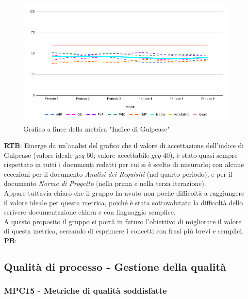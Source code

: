 \documentclass[10pt]{article}
\begin{document}
\begin{justify}
\begin{figure}[H]
  \centering
  \includegraphics[width=0.9\linewidth]{gulpease.png}
  \caption{Grafico a linee della metrica "Indice di Gulpease"}
  \label{fig:gulpease_chart}
\end{figure}

\textbf{RTB}: Emerge da un'analisi del grafico che il valore di accettazione dell'indice di Gulpease (valore ideale $geq$ 60; valore accettabile $geq$ 40), è stato quasi sempre rispettato in tutti i documenti
redatti per cui si è scelto di misurarlo; con alcune eccezioni per il documento \textit{Analisi dei Requisiti} (nel quarto periodo), e per il documento \textit{Norme di Progetto} (nella prima e nella terza iterazione).\\
Appare tuttavia chiaro che il gruppo ha avuto non poche difficoltà a raggiungere il valore ideale per questa metrica, poiché è stata sottovalutata la difficoltà dello 
scrivere documentazione chiara e con linguaggio semplice.\\
A questo proposito il gruppo si porrà in futuro l'obiettivo di migliorare il valore di questa metrica, cercando di esprimere i concetti con frasi più brevi e semplici.\\

\noindent
\textbf{PB}:


\subsection{Qualità di processo - Gestione della qualità}
\subsubsection{MPC15 - Metriche di qualità soddisfatte}%


\end{justify}
\end{document}
